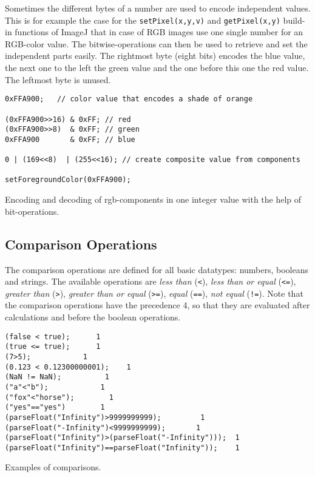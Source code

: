 Sometimes the different bytes of a number are used to encode independent values. This is for example the case for the {\tt setPixel(x,y,v)} and {\tt getPixel(x,y)} build-in functions of ImageJ that in case of RGB images use one single number for an RGB-color value. The bitwise-operations can then be used to retrieve and set the independent parts easily.
The rightmost byte (eight bits) encodes the blue value, the next one to the left the green value and the one before this one the red value. The leftmost byte is unused. 

\begin{listing}[H]
\begin{verbatim}
0xFFA900;	// color value that encodes a shade of orange

(0xFFA900>>16) & 0xFF; // red
(0xFFA900>>8)  & 0xFF; // green
0xFFA900       & 0xFF; // blue

0 | (169<<8)  | (255<<16); // create composite value from components

setForegroundColor(0xFFA900);
\end{verbatim}
\caption{Encoding and decoding of rgb-components in one integer value with the help of bit-operations.}
\label{lst:bit_operations_example}
\end{listing}

\subsection{Comparison Operations}

The comparison operations are defined for all basic datatypes: numbers, booleans and strings. The available operations are \textit{less than} ({\tt \textless}), \textit{less than or equal} ({\tt \textless =}), \textit{greater than} ({\tt \textgreater}), \textit{greater than or equal} ({\tt \textgreater =}), \textit{equal} ({\tt ==}), \textit{not equal} ({\tt !=}). Note that the comparison operations have the precedence 4, so that they are evaluated after calculations and before the boolean operations.

\begin{listing}[H]
\begin{verbatim}
(false < true);		 1
(true <= true);		 1
(7>5);			  1
(0.123 < 0.12300000001);	1
(NaN != NaN);		   1
("a"<"b");		      1
("fox"<"horse");		1
("yes"=="yes")		  1
(parseFloat("Infinity")>9999999999);		 1
(parseFloat("-Infinity")<9999999999);		1
(parseFloat("Infinity")>(parseFloat("-Infinity")));  1
(parseFloat("Infinity")==parseFloat("Infinity"));    1
\end{verbatim}
\caption{Examples of comparisons.}
\label{lst:comparisons}
\end{listing}

